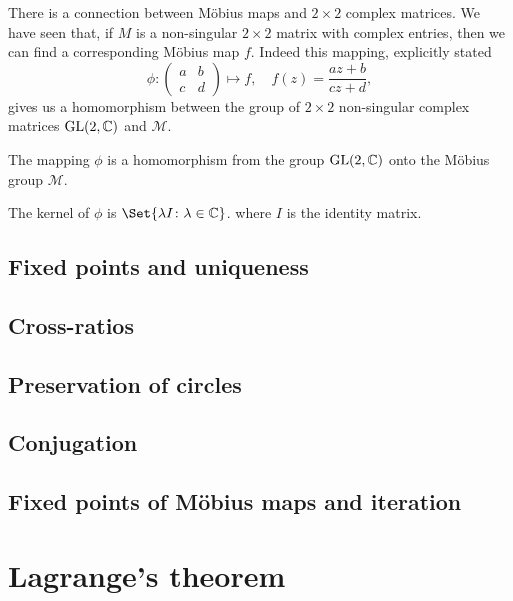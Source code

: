 \documentclass[main.tex]{subfiles}
\begin{document}
		There is a connection between M\"obius maps and $2 \times 2$ complex matrices. We have seen that, if $M$ is a non-singular $2 \times 2$ matrix with complex entries, then we can find a corresponding M\"obius map $f$. Indeed this mapping, explicitly stated
		\begin{equation*}
			\phi\colon 
			\begin{pmatrix}
			a	&	b 	\\
			c	&	d	
			\end{pmatrix}
			\mapsto f, \quad f(z) = \frac{az + b}{cz + d},
		\end{equation*}
		gives us a homomorphism between the group of $2 \times 2$ non-singular complex matrices $\mathrm{GL}(2, \mathbb C)$ and $\mathcal{M}$.
		\begin{theorem}
			The mapping $\phi$ is a homomorphism from the group $\mathrm{GL}(2, \mathbb C)$ onto the M\"obius group $\mathcal{M}$.
		\end{theorem}
		\begin{lemma}
			The kernel of $\phi$ is $\Set{\lambda I \colon \lambda \in \CC}$. where $I$ is the identity matrix.
		\end{lemma}
		
		\subsection{Fixed points and uniqueness}
			
		\subsection{Cross-ratios}
		
		\subsection{Preservation of circles}
		
		\subsection{Conjugation}
		
		\subsection{Fixed points of M\"obius maps and iteration}
		
		
		\section{Lagrange's theorem}
\end{document}
